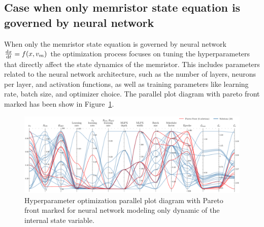 \documentclass[11pt, oneside]{article}
\newcommand{\dert}[1]{\frac{{\rm d} {#1}}{{\rm d} t} }
\begin{document}
\subsection{Case when only memristor state equation is governed by neural network}

When only the memristor state equation is governed by neural network
$\dert{x} = f(x,v_m)$ the optimization process focuses on tuning the hyperparameters that directly affect the state dynamics of the memristor. This includes parameters related to the neural network architecture, such as the number of layers, neurons per layer, and activation functions, as well as training parameters like learning rate, batch size, and optimizer choice. The parallel plot diagram with pareto front marked has been show in Figure~\ref{fig:nn_state_hyperparameter_optimization}.


\begin{figure}[H]
    \centering
    \includegraphics[width=\textwidth]{mms_figs/parallel_coordinates_plot_mlpx.pdf}
    \caption{Hyperparameter optimization parallel plot diagram with Pareto front marked for neural network modeling only dynamic of the internal state variable.}
    \label{fig:nn_state_hyperparameter_optimization}
\end{figure}



\clearpage
\printbibliography[heading=bibintoc]
\end{document}
